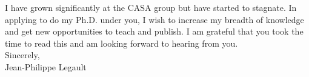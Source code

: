 \documentclass[english,letterpaper,12pt]{deedy-resume-openfont}
\begin{document}
I have grown significantly at the CASA group but have started to stagnate.
In applying to do my Ph.D. under you, I wish to increase my breadth of knowledge and get new opportunities to teach and publish.
I am grateful that you took the time to read this and am looking forward to hearing from you.\\

\noindent Sincerely,\\
\indent Jean-Philippe Legault
\end{document}

